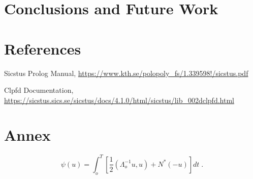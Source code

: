\documentclass[runningheads,a4paper]{llncs}
\begin{document}
\newpage
\section{Conclusions and Future Work}


\section{References}

\begin{thebibliography}{2}

 Sicstus Prolog Manual, \url{https://www.kth.se/polopoly_fs/1.339598!/sicstus.pdf}

 Clpfd Documentation, \url{https://sicstus.sics.se/sicstus/docs/4.1.0/html/sicstus/lib_002dclpfd.html}

\end{thebibliography}


\section{Annex}

\begin{equation}
  \psi (u) = \int_{o}^{T} \left[\frac{1}{2}
  \left(\Lambda_{o}^{-1} u,u\right) + N^{\ast} (-u)\right] dt \;  .
\end{equation}
\end{document}
